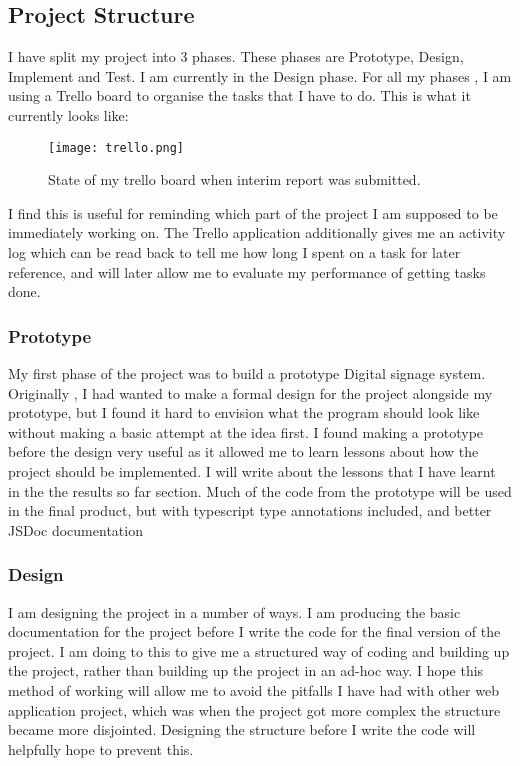 \documentclass{article}
\begin{document}
\subsection{Project Structure}
I have split my project into 3 phases. These phases are Prototype, Design, Implement and Test. I am currently in the Design phase. For all my phases , I am using a Trello board to organise the tasks that I have to do. This is what it currently looks like: 
\begin{figure}[h]
    \centering
    \texttt{[image: trello.png]}
    \caption{State of my trello board when interim report was submitted.}
    \label{fig:my_label}
\end{figure}

I find this is useful for reminding which part of the project I am supposed to be immediately working on. The Trello application additionally gives me an activity log which can be read back to tell me how long I spent on a task for later reference, and will later allow me to evaluate my performance of getting tasks done.

\subsubsection{Prototype}
My first phase of the project was to build a prototype Digital signage system. Originally , I had wanted to make a formal design for the project alongside my prototype, but I found it hard to envision what the program should look like without making a basic attempt at the idea first.  I found making a prototype before the design very useful as it allowed me to learn lessons about how the project should be implemented. I will write about the lessons that I have learnt in the the results so far section. Much of the code from the prototype will be used in the final product, but with typescript type annotations included, and better JSDoc documentation
\subsubsection{Design}
I am designing the project in a number of ways. I am producing the basic documentation for the project before I write the code for the final version of the project. I am doing to this to give me a structured way of coding and building up the project, rather than building up the project in an ad-hoc way. I hope this method of working will allow me to avoid the pitfalls I have had with other web application project, which was when the project got more complex the structure became more disjointed. Designing the structure before I write the code will helpfully hope to prevent this. 
\end{document}
